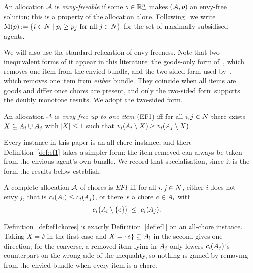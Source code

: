 An allocation $\mathcal{A}$ is \emph{envy-freeable} if some $p \in \mathbb{R}^n_+$
makes $(\mathcal{A},p)$ an envy-free solution; this is a property of the
allocation alone. Following~\cite{BKNS22} we write
$\mathrm{M}(p) := \left\{i \in N \mid p_i \ge p_j \text{ for
all } j \in N\right\}$ for the set of maximally subsidised agents.

We will also use the standard relaxation of envy-freeness. Note that
two inequivalent forms of it appear in this literature: the goods-only form
of~\cite{HS19}, which removes one item from the envied bundle, and the two-sided
form used by~\cite{KMSTY24}, which removes one item from \emph{either} bundle.
They coincide when all items are goods and differ once chores are present, and
only the two-sided form supports the doubly monotone results. We adopt the
two-sided form.

\begin{definition}
\label{def:ef1}
An allocation $\mathcal{A}$ is \emph{envy-free up to one item} (EF1) iff for all
$i, j \in N$ there exists $X \subseteq A_{i} \cup A_{j}$ with
$\left\lvert X\right\rvert \le 1$ such that
$v_i(A_{i} \setminus X) \ge v_i(A_{j} \setminus X)$.
\end{definition}

Every instance in this paper is an all-chore instance, and there
Definition~\ref{def:ef1} takes a simpler form: the item removed can always
be taken from the envious agent's own bundle. We record that specialisation,
since it is the form the results below establish.

\begin{definition}
\label{def:ef1chores}
A complete allocation $\mathcal{A}$ of chores is \emph{EF1} iff for all
$i, j \in N$, either $i$ does not envy $j$, that is
$c_i(A_{i}) \le c_i(A_{j})$, or there is a chore
$e \in A_{i}$ with
\[
  c_i\bigl(A_{i} \setminus \left\{e\right\}\bigr) \;\le\; c_i(A_{j}).
\]
\end{definition}

Definition~\ref{def:ef1chores} is exactly Definition~\ref{def:ef1} on an
all-chore instance. Taking $X = \emptyset$ in the first case and
$X = \left\{e\right\} \subseteq A_{i}$ in the second gives one direction; for the
converse, a removed item lying in $A_{j}$ only lowers
$c_i(A_{j})$'s counterpart on the wrong side of the inequality, so
nothing is gained by removing from the envied bundle when every item is a
chore.

